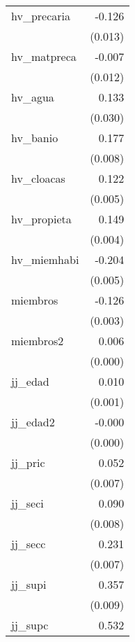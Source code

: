 {\begin{longtable}{l*{1}{D{.}{.}{-1}}}
\addlinespace
hv\_precaria &      -0.126\sym{***}\\
            &     (0.013)         \\
\addlinespace
hv\_matpreca &      -0.007         \\
            &     (0.012)         \\
\addlinespace
hv\_agua     &       0.133\sym{***}\\
            &     (0.030)         \\
\addlinespace
hv\_banio    &       0.177\sym{***}\\
            &     (0.008)         \\
\addlinespace
hv\_cloacas  &       0.122\sym{***}\\
            &     (0.005)         \\
\addlinespace
hv\_propieta &       0.149\sym{***}\\
            &     (0.004)         \\
\addlinespace
hv\_miemhabi &      -0.204\sym{***}\\
            &     (0.005)         \\
\addlinespace
miembros    &      -0.126\sym{***}\\
            &     (0.003)         \\
\addlinespace
miembros2   &       0.006\sym{***}\\
            &     (0.000)         \\
\addlinespace
jj\_edad     &       0.010\sym{***}\\
            &     (0.001)         \\
\addlinespace
jj\_edad2    &      -0.000\sym{***}\\
            &     (0.000)         \\
\addlinespace
jj\_pric     &       0.052\sym{***}\\
            &     (0.007)         \\
\addlinespace
jj\_seci     &       0.090\sym{***}\\
            &     (0.008)         \\
\addlinespace
jj\_secc     &       0.231\sym{***}\\
            &     (0.007)         \\
\addlinespace
jj\_supi     &       0.357\sym{***}\\
            &     (0.009)         \\
\addlinespace
jj\_supc     &       0.532\sym{***}\\

\end{longtable}}
